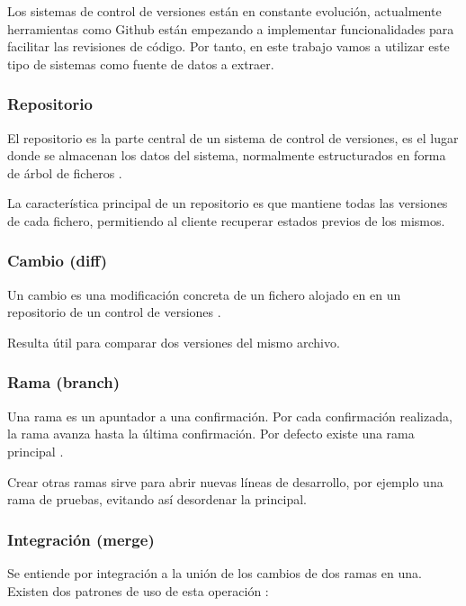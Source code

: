 Los sistemas de control de versiones están en constante evolución, actualmente herramientas como Github están empezando a implementar funcionalidades para facilitar  las revisiones de código. Por tanto, en este trabajo vamos a utilizar este tipo de sistemas como fuente de datos a extraer.

\subsubsection{Repositorio}

El repositorio es la parte central de un sistema de control de versiones, es el lugar donde se almacenan los datos del sistema, normalmente estructurados en forma de árbol de ficheros \cite{Pilato:2008:VCS:1435405}.

La característica principal de un repositorio es que mantiene todas las versiones de cada fichero, permitiendo al cliente recuperar estados previos de los mismos.

\subsubsection{Cambio (diff)}

Un cambio es una modificación concreta de un fichero alojado en en un repositorio de un control de versiones \cite{wiki:002}.

Resulta útil para comparar dos versiones del mismo archivo.

\subsubsection{Rama (branch)}

Una rama es un apuntador a una confirmación. Por cada confirmación realizada, la rama avanza hasta la última confirmación. Por defecto existe una rama principal \cite{Chacon:2014:PG:2695634}. 

Crear otras ramas sirve para abrir nuevas líneas de desarrollo, por ejemplo una rama de pruebas, evitando así desordenar la principal.

\subsubsection{Integración (merge)}

Se entiende por integración a la unión de los cambios de dos ramas en una. Existen dos patrones de uso de esta operación \cite{sbf5:git3}:

